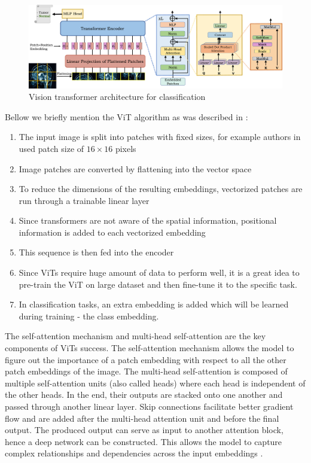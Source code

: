 \begin{figure}[H]
    \begin{centering}
    \includegraphics[width=14cm]{assets/images/vit.jpg}
    \par\end{centering}
    \caption{Vision transformer architecture for classification \cite{Shamshad2023}}
    \label{fig:vit}
\end{figure}

Bellow we briefly mention the ViT algorithm as was described in \cite{Shamshad2023}:

\begin{enumerate}
    \item The input image is split into patches with fixed sizes, for example authors in \cite{Dosovitskiy2020} used patch size of $16\times16$ pixels
    \item Image patches are converted by flattening into the vector space
    \item To reduce the dimensions of the resulting embeddings, vectorized patches are run through a trainable linear layer
    \item Since transformers are not aware of the spatial information, positional information is added to each vectorized embedding
    \item This sequence is then fed into the encoder
    \item Since ViTs require huge amount of data to perform well, it is a great idea to pre-train the ViT on large dataset and then fine-tune it to the specific task.
    \item In classification tasks, an extra embedding is added which will be learned during training - the class embedding.
\end{enumerate}

The self-attention mechanism and multi-head self-attention are the key components of ViTs success. The self-attention mechanism allows the model to figure out the importance of a patch embedding with respect to all the other patch embeddings of the image. The multi-head self-attention is composed of multiple self-attention units (also called heads) where each head is independent of the other heads. In the end, their outputs are stacked onto one another and passed through another linear layer. Skip connections facilitate better gradient flow and are added after the multi-head attention unit and before the final output. The produced output can serve as input to another attention block, hence a deep network can be constructed. This allows the model to capture complex relationships and dependencies across the input embeddings \cite{Shamshad2023}.


